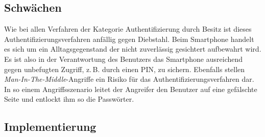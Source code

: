 \documentclass[11pt,a4paper,ngerman]{scrreprt}
\begin{document}
\subsection{Schwächen}
Wie bei allen Verfahren der Kategorie Authentifizierung durch Besitz ist dieses Authentifizierungsverfahren anfällig gegen Diebstahl. Beim Smartphone handelt es sich um ein Alltagsgegenstand der nicht zuverlässig gesichtert aufbewahrt wird. Es ist also in der Verantwortung des Benutzers das Smartphone ausreichend gegen unbefugten Zugriff, z.\,B. durch einen PIN, zu sichern. Ebenfalls stellen \textit{Man-In-The-Middle}-Angriffe ein Risiko für das Authentifizierungsverfahren dar. In so einem Angriffsszenario leitet der Angreifer den Benutzer auf eine gefälschte Seite und entlockt ihm so die Passwörter.

\subsection{Implementierung}\label{sec:TOTPImpl}
\end{document}
